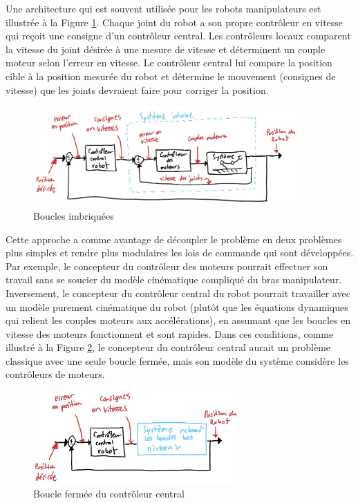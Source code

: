 Une architecture qui est souvent utilisée pour les robots manipulateurs est illustrée à la Figure \ref{fig:innerloop}. Chaque joint du robot a son propre contrôleur en vitesse qui reçoit une consigne d'un contrôleur central. Les contrôleurs locaux comparent la vitesse du joint désirée à une mesure de vitesse et déterminent un couple moteur selon l'erreur en vitesse. Le contrôleur central lui compare la position cible à la position mesurée du robot et détermine le mouvement (consignes de vitesse) que les joints devraient faire pour corriger la position.
\begin{figure}[htbp]
	\centering
	\includegraphics[width=0.9\textwidth]{fig/innerloop.jpg}
	\caption{Boucles imbriquées}
	\label{fig:innerloop}
\end{figure}

Cette approche a comme avantage de découpler le problème en deux problèmes plus simples et rendre plus modulaires les lois de commande qui sont développées. Par exemple, le concepteur du contrôleur des moteurs pourrait effectuer son travail sans se soucier du modèle cinématique compliqué du bras manipulateur. Inversement, le concepteur du contrôleur central du robot pourrait travailler avec un modèle purement cinématique du robot (plutôt que les équations dynamiques qui relient les couples moteurs aux accélérations), en assumant que les boucles en vitesse des moteurs fonctionnent et sont rapides. Dans ces conditions, comme illustré à la Figure \ref{fig:innerloop2}, le concepteur du contrôleur central aurait un problème classique avec une seule boucle fermée, mais son modèle du système considère les contrôleurs de moteurs.

\begin{figure}[htbp]
	\centering
	\includegraphics[width=0.7\textwidth]{fig/innerloop2.jpg}
	\caption{Boucle fermée du contrôleur central}
	\label{fig:innerloop2}
\end{figure}

